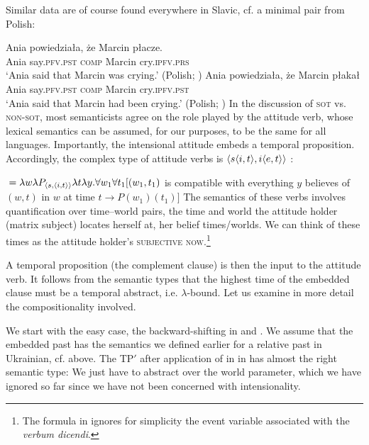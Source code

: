 \documentclass[output=paper,colorlinks,citecolor=brown]{langscibook}
\begin{document}
Similar data are of course found everywhere in Slavic, cf. a minimal pair from Polish:

\ea\ea\label{pol-att-pres}\gll
Ania powiedziała, że Marcin płacze.
\\ Ania say.\textsc{pfv}.\textsc{pst} \textsc{comp} Marcin cry.\textsc{ipfv}.\textsc{prs} \\ 
\glt `Ania said that Marcin was crying.' \hfill
(Polish; \cite[86]{kusumoto99}) 
\ex\label{pol-att-past}\gll
Ania powiedziała, że Marcin płakał
\\ Ania say.\textsc{pfv}.\textsc{pst} \textsc{comp} Marcin cry.\textsc{ipfv}.\textsc{pst} \\ 
\glt `Ania said that Marcin had been crying.' \hfill
(Polish; \cite[86]{kusumoto99}) 
\z\z
In the discussion of \textsc{sot} vs. \textsc{non-sot}, most semanticists  agree on the role played by the attitude verb, whose lexical semantics can be assumed, for our purposes, to be the same for all languages. Importantly, the intensional attitude embeds a temporal proposition. Accordingly, the complex type of attitude verbs is
$\langle{s\langle{i,t}\rangle,i\langle{e,t}\rangle}\rangle$ \citep{gronn_stechow2010}:

\ea\label{lewis}
 ${}=\lambda w \lambda P_{\stb{s,\stb{i,t}}} \lambda t \lambda y. \newline
\forall w_{1}
\forall t_{1}
[(w_{1},t_{1})$ is compatible with everything $y$ believes of $(w,t)$ in $w$ at time $t \rightarrow P(w_{1})(t_{1})] $ 
 \z
The  semantics of these verbs involves quantification over time--world pairs, the time and world the attitude holder (matrix subject) locates herself at, her belief times/worlds. We can think of these times as the attitude holder's \textsc{subjective now}.\footnote{The formula in  ignores for simplicity the event variable  associated with the \textit{verbum dicendi}.}

A temporal proposition (the complement clause) is then the input to the attitude verb. It follows from the semantic types that the highest time of the embedded clause must be a temporal abstract, i.e. $\lambda$-bound.
 Let us examine in more detail the compositionality involved.  

 We start with the easy case, the backward-shifting in  and . We assume that the embedded past has the semantics we defined earlier for a relative past  in Ukrainian, cf.  above. The TP$'$ after application of  in  in  has almost the right semantic type: We just have to abstract over the world parameter, which we have ignored so far since we have not been concerned with intensionality.
 
\end{document}
